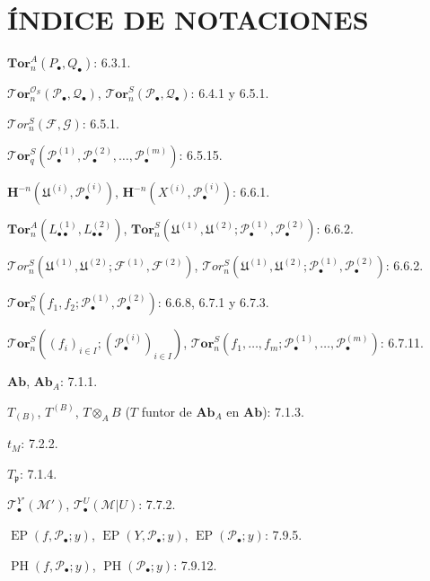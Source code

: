 \section*{ÍNDICE DE NOTACIONES}

\begin{flushleft}
$\mathbf{Tor}_n^A(P_\bullet,Q_\bullet)$: 6.3.1.

\medskip
$\boldsymbol{\mathscr{T}\!or}_n^{\mathscr O_S}(\mathscr P_\bullet,\mathscr Q_\bullet)$,
$\boldsymbol{\mathscr{T}\!or}_n^S(\mathscr P_\bullet,\mathscr Q_\bullet)$: 6.4.1 y 6.5.1.

\medskip
$\mathscr{T}\!or_n^S(\mathscr F,\mathscr G)$: 6.5.1.

\medskip
$\boldsymbol{\mathscr{T}\!or}_q^S(\mathscr P_\bullet^{(1)},\mathscr P_\bullet^{(2)},\ldots,
\mathscr P_\bullet^{(m)})$: 6.5.15.

\medskip
$\mathbf H^{-n}(\mathfrak U^{(i)},\mathscr P_\bullet^{(i)})$,
$\mathbf H^{-n}(X^{(i)},\mathscr P_\bullet^{(i)})$: 6.6.1.

\medskip
$\mathbf{Tor}_n^A(L_{\bullet\bullet}^{(1)},L_{\bullet\bullet}^{(2)})$,
$\mathbf{Tor}_n^S(\mathfrak U^{(1)},\mathfrak U^{(2)};
\mathscr P_\bullet^{(1)},\mathscr P_\bullet^{(2)})$: 6.6.2.

\medskip
$\mathscr{T}\!or_n^S(\mathfrak U^{(1)},\mathfrak U^{(2)};
\mathscr F^{(1)},\mathscr F^{(2)})$,
$\mathscr{T}\!or_n^S(\mathfrak U^{(1)},\mathfrak U^{(2)};
\mathscr P_\bullet^{(1)},\mathscr P_\bullet^{(2)})$: 6.6.2.

\medskip
$\boldsymbol{\mathscr{T}\!or}_n^S(f_1,f_2;\mathscr P_\bullet^{(1)},
\mathscr P_\bullet^{(2)})$: 6.6.8, 6.7.1 y 6.7.3.

\medskip
$\boldsymbol{\mathscr{T}\!or}_n^S((f_i)_{i\in I};(\mathscr P_\bullet^{(i)})_{i\in I})$,
$\boldsymbol{\mathscr{T}\!or}_n^S(f_1,\ldots,f_m;\mathscr P_\bullet^{(1)},\ldots,
\mathscr P_\bullet^{(m)})$: 6.7.11.

\medskip
$\boldsymbol{Ab}$, $\boldsymbol{Ab}_A$: 7.1.1.

\medskip
$T_{(B)}$, $T^{(B)}$, $T\otimes_A B$
($T$ funtor de $\boldsymbol{Ab}_A$ en $\boldsymbol{Ab}$): 7.1.3.

\medskip
$t_M$: 7.2.2.

\medskip
$T_{\mathfrak p}$: 7.1.4.

\medskip
$\mathscr T_\bullet^{Y'}(\mathscr M')$,
$\mathscr T_\bullet^U(\mathscr M|U)$: 7.7.2.

\medskip
$\operatorname{EP}(f,\mathscr P_\bullet;y)$,
$\operatorname{EP}(Y,\mathscr P_\bullet;y)$,
$\operatorname{EP}(\mathscr P_\bullet;y)$: 7.9.5.

\medskip
$\operatorname{PH}(f,\mathscr P_\bullet;y)$,
$\operatorname{PH}(\mathscr P_\bullet;y)$: 7.9.12.
\end{flushleft}

